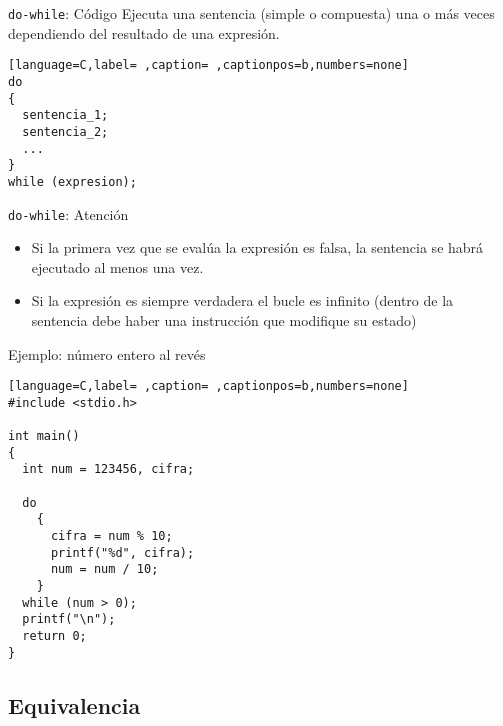 \documentclass[usenames,svgnames,dvipsnames, aspectratio=169]{beamer}
\begin{document}
\begin{frame}[label={sec:orgb86f537},fragile]{\texttt{do-while}: Código}
 Ejecuta una sentencia (simple o compuesta) \alert{una o más veces} dependiendo del resultado de una expresión.
\begin{lstlisting}[language=C,label= ,caption= ,captionpos=b,numbers=none]
do
{
  sentencia_1;
  sentencia_2;
  ...
}
while (expresion);
\end{lstlisting}
\end{frame}


\begin{frame}[label={sec:org198fb06},fragile]{\texttt{do-while}: Atención}
 \begin{block}{}
\begin{itemize}
\item Si la primera vez que se evalúa la expresión es falsa, la sentencia se habrá ejecutado al menos una vez.

\item Si la expresión es siempre verdadera \alert{el bucle es infinito} (dentro de la sentencia debe haber una instrucción que modifique su estado)
\end{itemize}
\end{block}
\end{frame}

\begin{frame}[label={sec:org236f529},fragile]{Ejemplo: número entero al revés}
 \begin{lstlisting}[language=C,label= ,caption= ,captionpos=b,numbers=none]
#include <stdio.h>

int main()
{
  int num = 123456, cifra;

  do
    {
      cifra = num % 10;
      printf("%d", cifra);
      num = num / 10;
    }
  while (num > 0);
  printf("\n");
  return 0;
}
\end{lstlisting}
\end{frame}


\subsection{Equivalencia}
\label{sec:orgc987b55}
\end{document}
